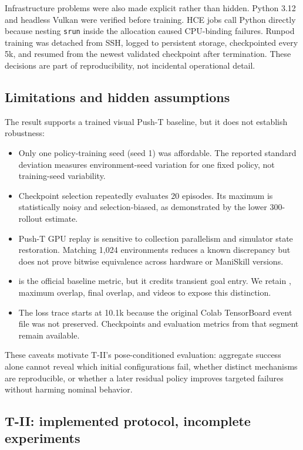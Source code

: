 Infrastructure problems were also made explicit rather than hidden. Python 3.12 and headless
Vulkan were verified before training. HCE jobs call Python directly because nesting \texttt{srun}
inside the allocation caused CPU-binding failures. Runpod training was detached from SSH, logged
to persistent storage, checkpointed every 5k, and resumed from the newest validated checkpoint
after termination. These decisions are part of reproducibility, not incidental operational detail.

\subsection{Limitations and hidden assumptions}

The result supports a trained visual Push-T baseline, but it does not establish robustness:
\begin{itemize}
    \item Only one policy-training seed (seed 1) was affordable. The reported standard deviation
    measures environment-seed variation for one fixed policy, not training-seed variability.
    \item Checkpoint selection repeatedly evaluates 20 episodes. Its maximum is statistically
    noisy and selection-biased, as demonstrated by the lower 300-rollout estimate.
    \item Push-T GPU replay is sensitive to collection parallelism and simulator state restoration.
    Matching 1,024 environments reduces a known discrepancy but does not prove bitwise equivalence
    across hardware or ManiSkill versions.
    \item \successonce is the official baseline metric, but it credits transient goal entry. We
    retain \successend, maximum overlap, final overlap, and videos to expose this distinction.
    \item The loss trace starts at 10.1k because the original Colab TensorBoard event file was not
    preserved. Checkpoints and evaluation metrics from that segment remain available.
\end{itemize}

These caveats motivate T-II's pose-conditioned evaluation: aggregate success alone cannot reveal
which initial configurations fail, whether distinct mechanisms are reproducible, or whether a
later residual policy improves targeted failures without harming nominal behavior.

\subsection{T-II: implemented protocol, incomplete experiments}

